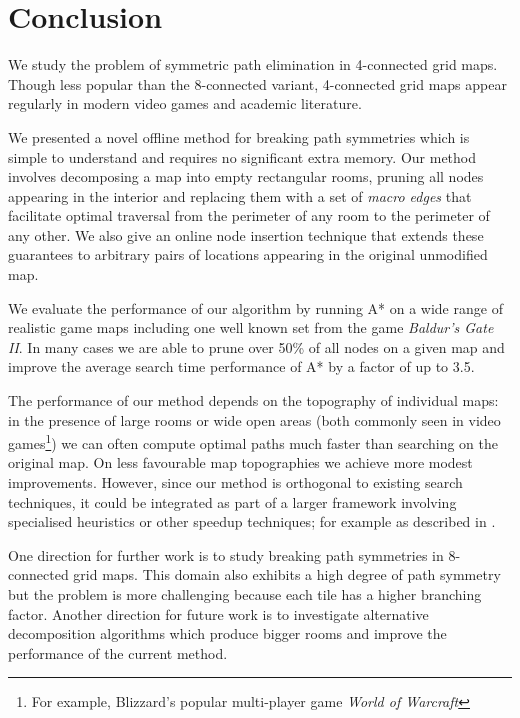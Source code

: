 \section{Conclusion}
We study the problem of symmetric path elimination in 4-connected grid maps.
Though less popular than the 8-connected variant, 4-connected grid maps appear 
regularly in modern video games and academic literature.
\par
We presented a novel offline method for breaking path symmetries which is simple
to understand and requires no significant extra memory. 
Our method involves decomposing a map into empty rectangular rooms, pruning all nodes
appearing in the interior and replacing them with a set of \emph{macro edges}
that facilitate optimal traversal from the perimeter of any room to the perimeter
of any other.
We also give an online node insertion technique that extends these guarantees
 to arbitrary pairs of locations appearing in the original unmodified map.
\par
We evaluate the performance of our algorithm by running A* on a wide
range of realistic game maps including one well known set from the game
\emph{Baldur's Gate II}. 
In many cases we are able to prune over 50\% of all nodes on a given map
and improve the average search time performance of A* by a factor of up to 3.5.
\par
The performance of our method depends on the topography of individual maps: 
in the presence of large rooms or wide open areas (both commonly seen in video games\footnote{For 
example, Blizzard's popular multi-player game \emph{World of Warcraft}})
we can often compute optimal paths much faster than searching on the original map. 
On less favourable map topographies we achieve more modest improvements.
However, since our method is orthogonal to existing search techniques, it could be integrated
as part of a larger framework involving specialised heuristics or other speedup techniques; 
for example as described in \cite{botea04,bjornsson05,bjornsson06}. 
\par
One direction for further work is to study breaking path symmetries
in 8-connected grid maps. 
This domain also exhibits a high degree of path symmetry but the problem is more
challenging because each tile has a higher branching factor. 
Another direction for future work is to investigate alternative decomposition
algorithms which produce bigger rooms and improve the performance of the current
method.
